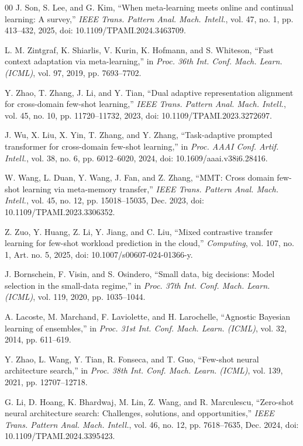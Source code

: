 \documentclass[a4paper,fleqn]{cas-sc}
\begin{document}
\begin{thebibliography}{00}
 J. Son, S. Lee, and G. Kim, ``When meta-learning meets online and continual learning: A survey,'' \emph{IEEE Trans. Pattern Anal. Mach. Intell.}, vol. 47, no. 1, pp. 413--432, 2025, doi: 10.1109/TPAMI.2024.3463709.

 L. M. Zintgraf, K. Shiarlis, V. Kurin, K. Hofmann, and S. Whiteson, ``Fast context adaptation via meta-learning,'' in \emph{Proc. 36th Int. Conf. Mach. Learn. (ICML)}, vol. 97, 2019, pp. 7693--7702.

 Y. Zhao, T. Zhang, J. Li, and Y. Tian, ``Dual adaptive representation alignment for cross-domain few-shot learning,'' \emph{IEEE Trans. Pattern Anal. Mach. Intell.}, vol. 45, no. 10, pp. 11720--11732, 2023, doi: 10.1109/TPAMI.2023.3272697.

 J. Wu, X. Liu, X. Yin, T. Zhang, and Y. Zhang, ``Task-adaptive prompted transformer for cross-domain few-shot learning,'' in \emph{Proc. AAAI Conf. Artif. Intell.}, vol. 38, no. 6, pp. 6012--6020, 2024, doi: 10.1609/aaai.v38i6.28416.

 W. Wang, L. Duan, Y. Wang, J. Fan, and Z. Zhang, ``MMT: Cross domain few-shot learning via meta-memory transfer,'' \emph{IEEE Trans. Pattern Anal. Mach. Intell.}, vol. 45, no. 12, pp. 15018--15035, Dec. 2023, doi: 10.1109/TPAMI.2023.3306352.

 Z. Zuo, Y. Huang, Z. Li, Y. Jiang, and C. Liu, ``Mixed contrastive transfer learning for few-shot workload prediction in the cloud,'' \emph{Computing}, vol. 107, no. 1, Art. no. 5, 2025, doi: 10.1007/s00607-024-01366-y.

J. Bornschein, F. Visin, and S. Osindero,
``Small data, big decisions: Model selection in the small-data regime,''
in \emph{Proc. 37th Int. Conf. Mach. Learn. (ICML)},
vol. 119, 2020, pp. 1035--1044.

A. Lacoste, M. Marchand, F. Laviolette, and H. Larochelle,
``Agnostic Bayesian learning of ensembles,''
in \emph{Proc. 31st Int. Conf. Mach. Learn. (ICML)},
vol. 32, 2014, pp. 611--619.

 Y. Zhao, L. Wang, Y. Tian, R. Fonseca, and T. Guo, ``Few-shot neural architecture search,'' in \emph{Proc. 38th Int. Conf. Mach. Learn. (ICML)}, vol. 139, 2021, pp. 12707--12718.

 G. Li, D. Hoang, K. Bhardwaj, M. Lin, Z. Wang, and R. Marculescu, ``Zero-shot neural architecture search: Challenges, solutions, and opportunities,'' \emph{IEEE Trans. Pattern Anal. Mach. Intell.}, vol. 46, no. 12, pp. 7618--7635, Dec. 2024, doi: 10.1109/TPAMI.2024.3395423.


\end{thebibliography}
\end{document}
